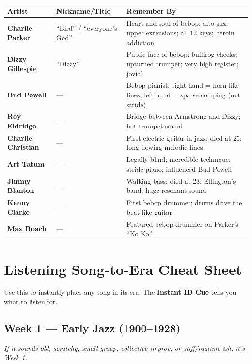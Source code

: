\documentclass[11pt,letterpaper]{article}
\begin{document}
\begin{small}
\begin{tabularx}{\textwidth}{>{\bfseries}p{3cm} p{3.2cm} X}
\toprule
\textbf{Artist} & \textbf{Nickname/Title} & \textbf{Remember By} \\
\midrule
Charlie Parker & ``Bird'' / ``everyone's God'' & Heart and soul of bebop; alto sax; upper extensions; all 12 keys; heroin addiction \\
Dizzy Gillespie & ``Dizzy'' & Public face of bebop; bullfrog cheeks; upturned trumpet; very high register; jovial \\
Bud Powell & --- & Bebop pianist; right hand = horn-like lines, left hand = sparse comping (not stride) \\
Roy Eldridge & --- & Bridge between Armstrong and Dizzy; hot trumpet sound \\
Charlie Christian & --- & First electric guitar in jazz; died at 25; long flowing melodic lines \\
Art Tatum & --- & Legally blind; incredible technique; stride piano; influenced Bud Powell \\
Jimmy Blanton & --- & Walking bass; died at 23; Ellington's band; huge resonant sound \\
Kenny Clarke & --- & First bebop drummer; drums drive the beat like guitar \\
Max Roach & --- & Featured bebop drummer on Parker's ``Ko Ko'' \\
\bottomrule
\end{tabularx}
\end{small}

\section{Listening Song-to-Era Cheat Sheet}

Use this to instantly place any song in its era. The \textbf{Instant ID Cue} tells you what to listen for.

\subsection{\textcolor{week1color}{Week 1 --- Early Jazz (1900--1928)}}
\emph{If it sounds old, scratchy, small group, collective improv, or stiff/ragtime-ish, it's Week 1.}
\end{document}
